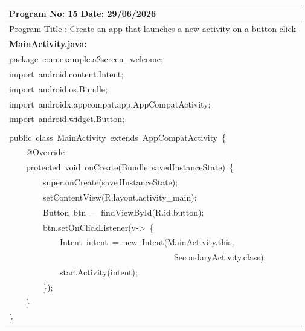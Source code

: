 \documentclass[a4paper,12pt]{article}
\begin{document}
\newpage

\noindent\begingroup
\renewcommand{\arraystretch}{1.1}
\begin{longtable}{|p{}|}
\hline\endfirsthead\hline\endhead\hline\endfoot\hline\endlastfoot
\rule{0pt}{13pt}Program No: 15 \hfill Date: 29/06/2026 \\
\hline
\rule{0pt}{13pt}Program Title : Create an app that launches a new activity on a button click \\
\hline
\rule{0pt}{13pt}\textbf{MainActivity.java:} \\
\hline
{\ttfamily\small package\ com.example.a2screen\_welcome;} \\
{\ttfamily\small import\ android.content.Intent;} \\
{\ttfamily\small import\ android.os.Bundle;} \\
{\ttfamily\small import\ androidx.appcompat.app.AppCompatActivity;} \\
{\ttfamily\small import\ android.widget.Button;} \\
\strut \\
{\ttfamily\small public\ class\ MainActivity\ extends\ AppCompatActivity\ \{} \\
{\ttfamily\small \ \ \ \ @Override} \\
{\ttfamily\small \ \ \ \ protected\ void\ onCreate(Bundle\ savedInstanceState)\ \{} \\
{\ttfamily\small \ \ \ \ \ \ \ \ super.onCreate(savedInstanceState);} \\
{\ttfamily\small \ \ \ \ \ \ \ \ setContentView(R.layout.activity\_main);} \\
{\ttfamily\small \ \ \ \ \ \ \ \ Button\ btn\ =\ findViewById(R.id.button);} \\
{\ttfamily\small \ \ \ \ \ \ \ \ btn.setOnClickListener(v-\textgreater{}\ \{} \\
{\ttfamily\small \ \ \ \ \ \ \ \ \ \ \ \ Intent\ intent\ =\ new\ Intent(MainActivity.this,\ } \\
{\ttfamily\small \ \ \ \ \ \ \ \ \ \ \ \ \ \ \ \ \ \ \ \ \ \ \ \ \ \ \ \ \ \ \ \ \ \ \ \ \ \ \ SecondaryActivity.class);} \\
{\ttfamily\small \ \ \ \ \ \ \ \ \ \ \ \ startActivity(intent);} \\
{\ttfamily\small \ \ \ \ \ \ \ \ \});} \\
{\ttfamily\small \ \ \ \ \}} \\
{\ttfamily\small \}} \\

\end{longtable}
\end{document}
